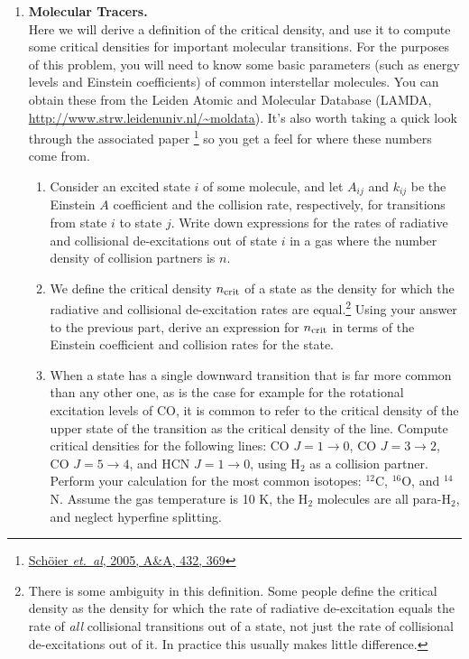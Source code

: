 \problemset

\begin{enumerate}

\item \textbf{Molecular Tracers.}\\
Here we will derive a definition of the critical density, and use it to compute some critical densities for important molecular transitions. For the purposes of this problem, you will need to know some basic parameters (such as energy levels and Einstein coefficients) of common interstellar molecules. You can obtain these from the Leiden Atomic and Molecular Database (LAMDA, \url{http://www.strw.leidenuniv.nl/~moldata}). It's also worth taking a quick look through the associated paper \citep{schoier05a}\footnote{\href{http://adsabs.harvard.edu/abs/2005A\%26A...432..369S}{Sch\"{o}ier {\it et.~al}, 2005, A\&A, 432, 369}} so you get a feel for where these numbers come from.
\begin{enumerate}
\item Consider an excited state $i$ of some molecule, and let $A_{ij}$ and $k_{ij}$ be the Einstein $A$ coefficient and the collision rate, respectively, for transitions from state $i$ to state $j$. Write down expressions for the rates of radiative and collisional de-excitations out of state $i$ in a gas where the number density of collision partners is $n$.
\item We define the critical density $n_{\rm crit}$ of a state as the density for which the radiative and collisional de-excitation rates are equal.\footnote{There is some ambiguity in this definition. Some people define the critical density as the density for which the rate of radiative de-excitation equals the rate of {\it all} collisional transitions out of a state, not just the rate of collisional de-excitations out of it. In practice this usually makes little difference.} Using your answer to the previous part, derive an expression for $n_{\rm crit}$ in terms of the Einstein coefficient and collision rates for the state. 
\item When a state has a single downward transition that is far more common than any other one, as is the case for example for the rotational excitation levels of CO, it is common to refer to the critical density of the upper state of the transition as the critical density of the line. Compute critical densities for the following lines: CO $J=1\rightarrow 0$, CO $J=3\rightarrow 2$, CO $J=5\rightarrow 4$, and HCN $J=1\rightarrow 0$, using H$_2$ as a collision partner. Perform your calculation for the most common isotopes: $^{12}$C, $^{16}$O, and $^{14}$N. Assume the gas temperature is 10 K, the H$_2$ molecules are all para-H$_2$, and neglect hyperfine splitting.

\end{enumerate}
\end{enumerate}
